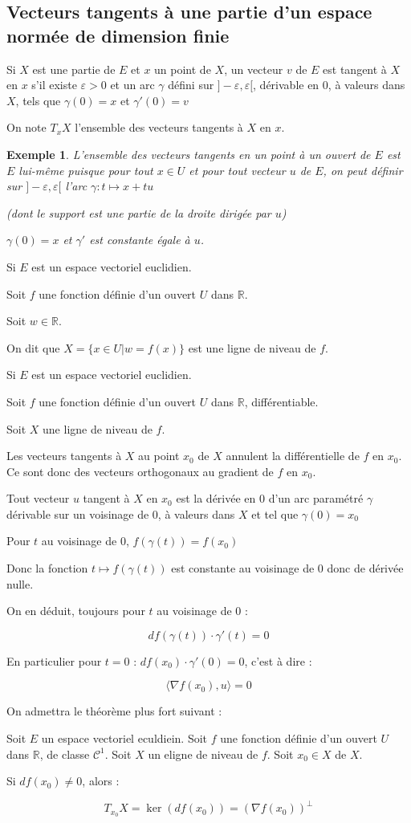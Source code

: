 \documentclass[a4paper,12pt]{book}
\newcommand{\Def}[2]{\begin{tcolorbox}[sharp corners, colback=white,colframe=blue!90!black!75, title=Définition : #1]#2\end{tcolorbox}}
\newcommand{\Thr}[2]{\begin{tcolorbox}[sharp corners, colback=white,colframe=red!90!black!75, title=Théorème : #1]#2\end{tcolorbox}}
\newcommand{\Prop}[2]{\begin{tcolorbox}[sharp corners, colback=white,colframe=red!90!black!75, title=Proposition : #1]#2\end{tcolorbox}}
\newcommand{\Pre}[1]{\begin{tcolorbox}[sharp corners, colback=white,colframe=green!60!green!30!black!75, title=Preuve]#1\end{tcolorbox}}
\newtheorem{Exe}{Exemple}[section]
\def\R{\mathbb{R}}
\begin{document}
\subsection{Vecteurs tangents à une partie d'un espace normée de dimension finie}
\Def{}{Si $X$ est une partie de $E$ et $x$ un point de $X$, un vecteur $v$ de $E$ est tangent à $X$ en $x$ s'il existe $\varepsilon>0$ et un arc $\gamma$ défini sur $]-\varepsilon, \varepsilon[$, dérivable en $0$, à valeurs dans $X$, tels que $\gamma(0)=x$ et $\gamma'(0)=v$
\par On note $T_xX$ l'ensemble des vecteurs tangents à $X$ en $x$.}
\begin{Exe}
L'ensemble des vecteurs tangents en un point à un ouvert de $E$ est $E$ lui-même puisque pour tout $x\in U$ et pour tout vecteur $u$ de $E$, on peut définir sur $]-\varepsilon, \varepsilon[$ l'arc $\gamma:t\mapsto x+tu$
\par (dont le support est une partie de la droite dirigée par $u$)
\par $\gamma(0)=x$ et $\gamma'$ est constante égale à $u$.
\end{Exe}
\Def{}{Si $E$ est un espace vectoriel euclidien.
\par Soit $f$ une fonction définie d'un ouvert $U$ dans $\R$.
\par Soit $w\in\R$.
\par On dit que $X = \{x\in U\vert w= f(x)\}$ est une ligne de niveau de $f$.
}
\Prop{}{Si $E$ est un espace vectoriel euclidien.
\par Soit $f$ une fonction définie d'un ouvert $U$ dans $\R$, différentiable.
\par Soit $X$ une ligne de niveau de $f$.
\par Les vecteurs tangents à $X$ au point $x_0$ de $X$ annulent la différentielle de $f$ en $x_0$.
Ce sont donc des vecteurs orthogonaux au gradient de $f$ en $x_0$.}
\Pre{Tout vecteur $u$ tangent à $X$ en $x_0$ est la dérivée en $0$ d'un arc paramétré $\gamma$ dérivable sur un voisinage de $0$, à valeurs dans $X$ et tel que $\gamma(0)=x_0$
\par Pour $t$ au voisinage de $0$, $f(\gamma(t))=f(x_0)$
\par Donc la fonction $t\mapsto f(\gamma(t))$ est constante au voisinage de $0$ donc de dérivée nulle.
\par On en déduit, toujours pour $t$ au voisinage de $0$ :
\par $$df(\gamma(t))\cdot\gamma'(t)=0$$
\par En particulier pour $t=0$ : $df(x_0)\cdot \gamma'(0)=0$, c'est à dire :
\par $$\langle\nabla f(x_0), u\rangle=0$$}
On admettra le théorème plus fort suivant :
\Thr{}{Soit $E$ un espace vectoriel eculdiein. Soit $f$ une fonction définie d'un ouvert $U$ dans $\R$, de classe $\mathcal{C}^1$. Soit $X$ un eligne de niveau de $f$. Soit $x_0\in X$ de $X$.
\par Si $df(x_0)\neq 0$, alors :
\par $$T_{x_0}X =\ker(df(x_0))=(\nabla f(x_0))^\perp$$}
\end{document}
